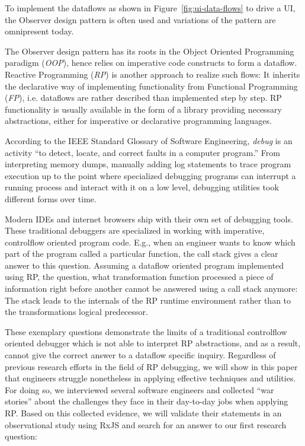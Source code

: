 \documentclass[12pt,a4paper]{article}
\begin{document}
To implement the dataflows as shown in Figure~\ref{fig:ui-data-flows} to drive a UI, the Observer design pattern\cite{gamma1995design} is often used and variations of the pattern are omnipresent today.

The Observer design pattern has its roots in the Object Oriented Programming paradigm (\emph{OOP}), hence relies on imperative code constructs to form a dataflow. Reactive Programming (\emph{RP}) is another approach to realize such flows: It inherits the declarative way of implementing functionality from Functional Programming (\emph{FP}), i.e. dataflows are rather described than implemented step by step\cite{10.1145/2501654.2501666}. RP functionality is usually available in the form of a library providing necessary abstractions, either for imperative or declarative programming languages.

According to the IEEE Standard Glossary of Software Engineering, \emph{debug} is an activity ``to detect, locate, and correct faults in a computer program.''\cite{ieeeglossary} From interpreting memory dumps, manually adding log statements to trace program execution up to the point where specialized debugging programs can interrupt a running process and interact with it on a low level, debugging utilities took different forms over time.

Modern IDEs and internet browsers ship with their own set of debugging tools. These traditional debuggers are specialized in working with imperative, controlflow oriented program code. E.g., when an engineer wants to know which part of the program called a particular function, the call stack gives a clear answer to this question. Assuming a dataflow oriented program implemented using RP, the question, what transformation function processed a piece of information right before another cannot be answered using a call stack anymore: The stack leads to the internals of the RP runtime environment rather than to the transformations logical predecessor.

These exemplary questions demonstrate the limits of a traditional controlflow oriented debugger which is not able to interpret RP abstractions, and as a result, cannot give the correct answer to a dataflow specific inquiry. Regardless of previous research efforts \cite{10.1145/2577080.2577083} \cite{10.1145/2884781.2884815} \cite{10.1145/3180155.3180156} in the field of RP debugging, we will show in this paper that engineers struggle nonetheless in applying effective techniques and utilities. For doing so, we interviewed several software engineers and collected ``war stories'' about the challenges they face in their day-to-day jobs when applying RP. Based on this collected evidence, we will validate their statements in an observational study using RxJS and search for an answer to our first research question:
\end{document}
